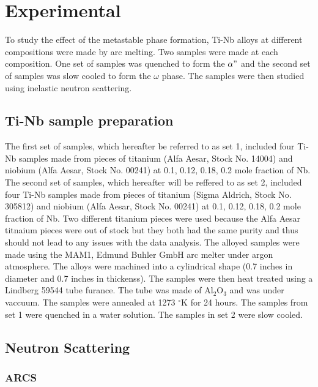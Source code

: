 \section{Experimental}

To study the effect of the metastable phase formation, Ti-Nb alloys at different compositions were made by arc melting. Two samples were made at each composition. One set of samples was quenched to form the $\alpha"$ and the second set of samples was slow cooled to form the $\omega$ phase. The samples were then studied using inelastic neutron scattering. 

\subsection{Ti-Nb sample preparation}

The first set of samples, which hereafter be referred to as set 1, included four Ti-Nb samples made from pieces of titanium (Alfa Aesar, Stock No. 14004) and niobium (Alfa Aesar, Stock No. 00241) at 0.1, 0.12, 0.18, 0.2 mole fraction of Nb. The second set of samples, which hereafter will be reffered to as set 2, included four Ti-Nb samples made from pieces of titanium (Sigma Aldrich, Stock No. 305812) and niobium (Alfa Aesar, Stock No. 00241) at 0.1, 0.12, 0.18, 0.2 mole fraction of Nb. Two different titanium pieces were used because the Alfa Aesar titnaium pieces were out of stock but they both had the same purity and thus should not lead to any issues with the data analysis. The alloyed samples were made using the MAM1, Edmund Buhler GmbH arc melter under argon atmosphere. The alloys were machined into a cylindrical shape (0.7 inches in diameter and 0.7 inches in thickenss). The samples were then heat treated using a Lindberg 59544 tube furance. The tube was made of Al$_{2}$O$_{3}$ and was under vaccuum. The samples were annealed at 1273 $^\circ$K for 24 hours. The samples from set 1 were quenched in a water solution. The samples in set 2 were slow cooled. 

\subsection{Neutron Scattering}

\subsubsection{ARCS}

